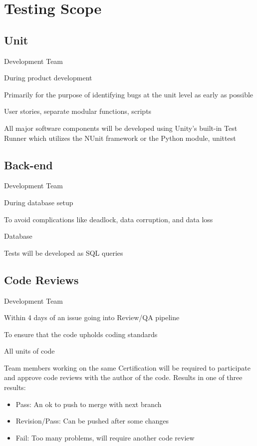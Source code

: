 \documentclass[letterpaper,10pt,english,openany,oneside]{sphinxmanual}
\begin{document}
\section{Testing Scope}
\label{\detokenize{test_plan/strategy:testing-scope}}

\subsection{Unit}
\label{\detokenize{test_plan/strategy:unit}}
 Development Team

 During product development

 Primarily for the purpose of identifying bugs at the unit level as early as possible

 User stories, separate modular functions, scripts

 All major software components will be developed using Unity’s built-in Test Runner which utilizes the NUnit framework or the Python module, unittest


\subsection{Back-end}
\label{\detokenize{test_plan/strategy:back-end}}
 Development Team

 During database setup

 To avoid complications like deadlock, data corruption, and data loss

 Database

 Tests will be developed as SQL queries


\subsection{Code Reviews}
\label{\detokenize{test_plan/strategy:code-reviews}}
 Development Team

 Within 4 days of an issue going into Review/QA pipeline

 To ensure that the code upholds coding standards

 All units of code

 Team members working on the same Certification will be required to participate and approve code reviews with the author of the code. Results in one of three results:
\begin{itemize}
\item {} 
Pass: An ok to push to merge with next branch

\item {} 
Revision/Pass: Can be pushed after some changes

\item {} 
Fail: Too many problems, will require another code review

\end{itemize}
\end{document}
